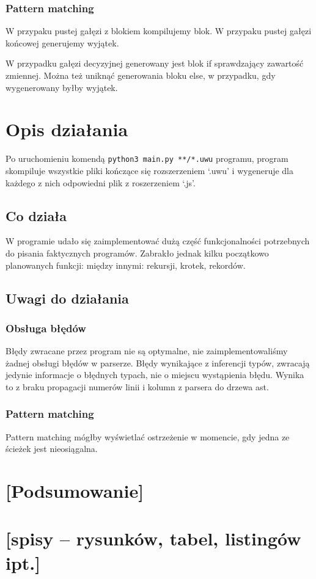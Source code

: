 \documentclass{article}
\begin{document}
\subsubsection{Pattern matching}
W przypaku pustej gałęzi z blokiem kompilujemy blok.
W przypaku pustej gałęzi końcowej generujemy wyjątek.


W przypadku gałęzi decyzyjnej generowany jest blok if sprawdzający zawartość zmiennej. Można też uniknąć generowania bloku else, w przypadku, gdy wygenerowany byłby wyjątek.\newpage


\section{Opis działania}
Po uruchomieniu komendą \lstinline{python3 main.py **/*.uwu} programu, program skompiluje wszystkie pliki kończące się rozszerzeniem `.uwu' i wygeneruje dla każdego z nich odpowiedni plik z roszerzeniem `.js'.

\subsection{Co działa}
W programie udało się zaimplementować dużą część funkcjonalności potrzebnych do pisania faktycznych programów. Zabrakło jednak kilku początkowo planowanych funkcji: między innymi: rekursji, krotek, rekordów.
\subsection{Uwagi do działania}
\subsubsection{Obsługa błędów}
Błędy zwracane przez program nie są optymalne, nie zaimplementowaliśmy żadnej obsługi błędów w parserze. Błędy wynikające z inferencji typów, zwracają jedynie informacje o błędnych typach, nie o miejscu wystąpienia błędu. Wynika to z braku propagacji numerów linii i kolumn z parsera do drzewa ast.
\subsubsection{Pattern matching}
Pattern matching mógłby wyświetlać ostrzeżenie w momencie, gdy jedna ze ścieżek jest nieosiągalna.
\section{[Podsumowanie]}
\section{[spisy -- rysunków, tabel, listingów ipt.]}




\end{document}
